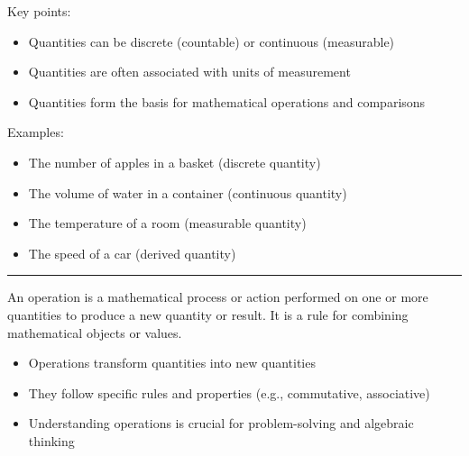 \documentclass[
  letterpaper,
  DIV=11,
  numbers=noendperiod]{scrartcl}
\providecommand{\tightlist}{%
  \setlength{\itemsep}{0pt}\setlength{\parskip}{0pt}}\usepackage{longtable,booktabs,array}
\begin{document}
Key points:

\begin{itemize}
\tightlist
\item
  Quantities can be discrete (countable) or continuous (measurable)
\item
  Quantities are often associated with units of measurement
\item
  Quantities form the basis for mathematical operations and comparisons
\end{itemize}

Examples:

\begin{itemize}
\tightlist
\item
  The number of apples in a basket (discrete quantity)
\item
  The volume of water in a container (continuous quantity)
\item
  The temperature of a room (measurable quantity)
\item
  The speed of a car (derived quantity)
\end{itemize}

\begin{center}\rule{0.5\linewidth}{0.5pt}\end{center}

\begin{tcolorbox}[enhanced jigsaw, toptitle=1mm, bottomtitle=1mm, breakable, toprule=.15mm, colbacktitle=quarto-callout-note-color!10!white, left=2mm, bottomrule=.15mm, titlerule=0mm, leftrule=.75mm, rightrule=.15mm, opacityback=0, coltitle=black, title={Operation}, opacitybacktitle=0.6, colback=white, arc=.35mm, colframe=quarto-callout-note-color-frame]

An operation is a mathematical process or action performed on one or
more quantities to produce a new quantity or result. It is a rule for
combining mathematical objects or values.

\end{tcolorbox}

\begin{itemize}
\tightlist
\item
  Operations transform quantities into new quantities
\item
  They follow specific rules and properties (e.g., commutative,
  associative)
\item
  Understanding operations is crucial for problem-solving and algebraic
  thinking
\end{itemize}
\end{document}
